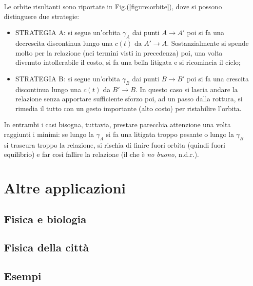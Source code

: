 \documentclass[12pt, a4paper]{book}
\theoremstyle{theorem}
\newtheorem{theorem}{Teorema}[section]
\begin{document}
				Le orbite risultanti sono riportate in Fig.(\ref{figure:orbite}), dove si possono distinguere due strategie:
				\begin{itemize}
					\item STRATEGIA A: si segue un'orbita $\gamma_{A}$ dai punti $A\rightarrow A'$ poi si fa una decrescita discontinua lungo una $c(t)$ da $A'\rightarrow A$.
						Sostanzialmente si spende molto per la relazione (nei termini visti in precedenza) poi, una volta divenuto intollerabile il costo, si fa una bella litigata e si ricomincia il ciclo;
					\item STRATEGIA B: si segue un'orbita $\gamma_{B}$ dai punti $B\rightarrow B'$ poi si fa una crescita discontinua lungo una $c(t)$ da $B'\rightarrow B$.
						In questo caso si lascia andare la relazione senza apportare sufficiente sforzo poi, ad un passo dalla rottura, si rimedia il tutto con un gesto importante (alto costo) per ristabilire l'orbita.
				\end{itemize}
				In entrambi i casi bisogna, tuttavia, prestare parecchia attenzione una volta raggiunti i minimi: se lungo la $\gamma_{A}$ si fa una litigata troppo pesante o lungo la $\gamma_{B}$ si trascura troppo la relazione, si rischia di finire fuori orbita (quindi fuori equilibrio) e far così fallire la relazione (il che è \emph{no buono}, n.d.r.).


	\chapter{Altre applicazioni} %
		\section{Fisica e biologia}

		\section{Fisica della città}

		\section{Esempi}


		
\end{document}
